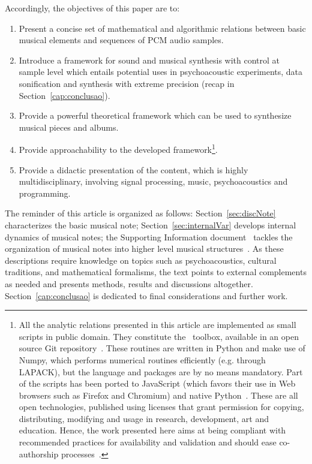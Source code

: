 Accordingly, the objectives of this paper are to:
\begin{enumerate}
	\item Present a concise set of mathematical and algorithmic relations between basic musical elements and sequences of PCM audio samples.
	\item Introduce a framework for sound and musical synthesis with control at sample level which entails potential uses in psychoacoustic experiments, data sonification and synthesis with extreme precision (recap in Section~\ref{cap:conclusao}).
	\item Provide a powerful theoretical framework which can be used to synthesize musical pieces and albums.
	\item Provide approachability to the developed framework\footnote{All
		the analytic relations presented in this article are implemented as small scripts in public domain.
		They constitute the \massa\ toolbox, available in an open source Git repository~\cite{gitBook}.
		These routines are written in Python and make use of Numpy,
		which performs numerical routines efficiently (e.g. through LAPACK),
		but the language and packages are by no means mandatory.
		Part of the scripts has been ported to JavaScript
		(which favors their use in Web browsers such as Firefox and Chromium)
		and native Python~\cite{numpy, tutpython, python}.
		These are all open technologies, published using licenses 
		that grant permission for copying,
		distributing, modifying and usage in research, development, art and education.
		Hence, the work presented here aims at being compliant with recommended
		practices for availability and validation
		and should ease co-authorship processes~\cite{Raymond,Lessig}.}.
	\item Provide a didactic presentation of the content, which is highly multidisciplinary,
		involving signal processing, music, psychoacoustics and programming.
\end{enumerate}

The reminder of this article is organized as follows:
Section~\ref{sec:discNote} characterizes the basic musical note;
Section~\ref{sec:internalVar} develops internal dynamics of musical notes;
the Supporting Information document~\cite{massNotesInMusic} tackles the organization of musical notes into
higher level musical structures~\cite{Wisnick,Webern,Lerdahl,Cook,Lacerda,Zamacois,Schoenberg,microsound}.
As these descriptions require knowledge on topics such as psychoacoustics, cultural traditions,
and mathematical formalisms, the text points to external complements as needed
and presents methods, results and discussions altogether.
Section~\ref{cap:conclusao} is dedicated to final considerations and further work.

